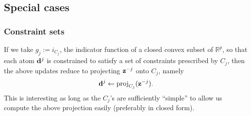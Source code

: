 
\subsection{Special cases}
\subsubsection{Constraint sets}
If we take $g_j := i_{C_j}$, the indicator function of a closed convex subset of $\mathbb R^p$, so that each atom $\mathbf{d}^j$ is constrained to satisfy a set of constraints prescribed by $C_j$, then the above updates reduce to projecting $\mathbf{z}^{-j}$ onto $C_j$, namely
\begin{equation}
\mathbf{d}^j \leftarrow  \text{proj}_{C_j}(\mathbf{z}^{-j}).
\end{equation}
This is interesting as long as the $C_j$'s are sufficiently ``simple'' to allow us compute the above projection easily (preferably in closed form).

